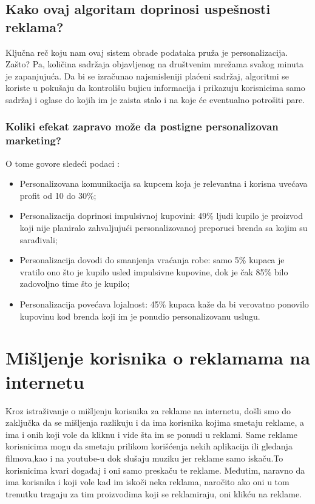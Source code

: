 \documentclass[a4paper]{article}
\begin{document}
{{	\subsection{Kako ovaj algoritam doprinosi uspešnosti reklama?}
	\label{subsec:uspesnostreklama}
	Ključna reč koju nam ovaj sistem obrade podataka pruža je personalizacija. Zašto? Pa, količina sadržaja objavljenog na društvenim mrežama svakog minuta je zapanjujuća. Da bi se izračunao najsmisleniji plaćeni sadržaj, algoritmi se koriste u pokušaju da kontrolišu bujicu 		informacija i prikazuju korisnicima samo sadržaj i oglase do kojih im je zaista stalo i na koje će eventualno potrošiti pare.
	\subsubsection{Koliki efekat zapravo može da postigne personalizovan marketing?}
	O tome govore sledeći podaci \cite{statistikai}:
	\begin{itemize}
    \item Personalizovana komunikacija sa kupcem koja je relevantna i korisna uvećava profit od 10 do 30\%;
    \item Personalizacija doprinosi impulsivnoj kupovini: 49\% ljudi kupilo je proizvod koji nije planiralo zahvaljujući personalizovanoj preporuci brenda sa kojim su sarađivali;
    \item Personalizacija dovodi do smanjenja vraćanja robe: samo 5\% kupaca je vratilo ono što je kupilo usled impulsivne kupovine, dok je čak 85\% bilo zadovoljno time što je kupilo;
    \item Personalizacija povećava lojalnost: 45\% kupaca kaže da bi verovatno ponovilo kupovinu kod brenda koji im je ponudio personalizovanu uslugu.
   	 \end{itemize} 
	

	\section{Mišljenje korisnika o reklamama na internetu}
	\label{sec:misljenje}
	Kroz istraživanje o mišljenju korisnika za reklame na internetu, došli smo do zaključka da se mišljenja razlikuju i da ima korisnika kojima smetaju reklame, a ima i onih koji vole da kliknu i vide šta im se ponudi u reklami.
	Same reklame korisnicima mogu da smetaju prilikom korišćenja nekih aplikacija ili gledanja filmova,kao i na youtube-u dok slušaju muziku jer reklame samo iskaču.To korisnicima kvari događaj i oni samo preskaču te reklame.
	Međutim, naravno da ima korisnika i koji vole kad im iskoči neka reklama, naročito ako oni u tom trenutku tragaju za tim proizvodima koji se reklamiraju, oni klikću na reklame.
}}
\end{document}
